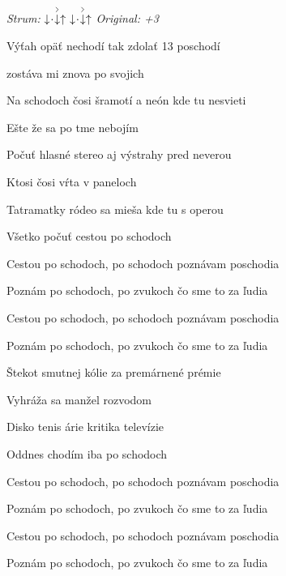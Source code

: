 \begin{song}


 \quad
\textit{Strum:} $\Down\Miss\AccentDown\Up\ \Down\Miss\AccentDown\Up$ \quad
\textit{Original: +3}

\Large


\Large

\bigskip

Výťah opäť nechodí tak zdolať 13 poschodí \par
{}zostáva mi znova po svojich \par
Na schodoch čosi šramotí a neón kde tu nesvieti \par
{}Ešte že sa po tme nebojím \par

\bigskip

Počuť hlasné stereo aj výstrahy pred neverou \par
{}Ktosi čosi vŕta v paneloch \par
{}Tatramatky ródeo sa mieša kde tu s operou \par
{}Všetko počuť cestou po schodoch \par

\bigskip

Cestou po schodoch, po schodoch poznávam poschodia \par
Poznám po schodoch, po zvukoch čo sme to za ľudia \par
Cestou po schodoch, po schodoch poznávam poschodia \par
Poznám po schodoch, po zvukoch čo sme to za ľudia \par

\bigskip

Štekot smutnej kólie za premárnené prémie \par
{}Vyhráža sa manžel rozvodom \par
{}Disko tenis árie kritika televízie \par
{}Oddnes chodím iba po schodoch \par

\bigskip

Cestou po schodoch, po schodoch poznávam poschodia \par
Poznám po schodoch, po zvukoch čo sme to za ľudia \par
Cestou po schodoch, po schodoch poznávam poschodia \par
Poznám po schodoch, po zvukoch čo sme to za ľudia \par

\end{song}
